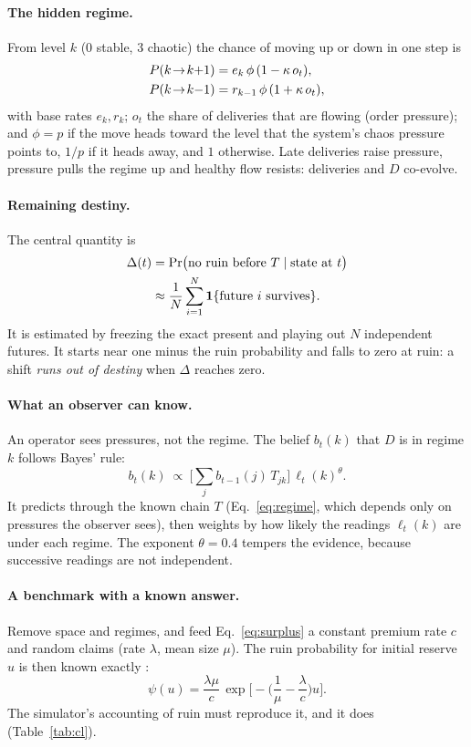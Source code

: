 \documentclass[10pt,twocolumn,a4paper]{article}
\begin{document}
\paragraph{The hidden regime.} From level $k$ (0 stable, 3 chaotic) the chance of moving up or down in one step is
\begin{align}
P(k\!\to\!k{+}1)&=e_k\,\phi\,(1-\kappa\,o_t),\notag\\
P(k\!\to\!k{-}1)&=r_{k-1}\,\phi\,(1+\kappa\,o_t),\label{eq:regime}
\end{align}
with base rates $e_k,r_k$; $o_t$ the share of deliveries that are flowing (order pressure); and $\phi=p$ if the move heads toward the level that the system's chaos pressure points to, $1/p$ if it heads away, and $1$ otherwise. Late deliveries raise pressure, pressure pulls the regime up and healthy flow resists: deliveries and $D$ co-evolve.

\paragraph{Remaining destiny.} The central quantity is
\begin{align}
\Delta(t)&=\Pr\!\big(\text{no ruin before } T\mid\text{state at } t\big)\label{eq:destiny}\\
&\approx\frac1N\sum_{i=1}^{N}\mathbf 1\{\text{future } i\ \text{survives}\}.\notag
\end{align}
It is estimated by freezing the exact present and playing out $N$ independent futures. It starts near one minus the ruin probability and falls to zero at ruin: a shift \emph{runs out of destiny} when $\Delta$ reaches zero.

\paragraph{What an observer can know.} An operator sees pressures, not the regime. The belief $b_t(k)$ that $D$ is in regime $k$ follows Bayes' rule:
\begin{equation}\label{eq:filter}
b_t(k)\ \propto\ \Big[\sum_{j}b_{t-1}(j)\,T_{jk}\Big]\,\ell_t(k)^{\theta}.
\end{equation}
It predicts through the known chain $T$ (Eq.~\ref{eq:regime}, which depends only on pressures the observer sees), then weights by how likely the readings $\ell_t(k)$ are under each regime. The exponent $\theta=0.4$ tempers the evidence, because successive readings are not independent.

\paragraph{A benchmark with a known answer.} Remove space and regimes, and feed Eq.~\eqref{eq:surplus} a constant premium rate $c$ and random claims (rate $\lambda$, mean size $\mu$). The ruin probability for initial reserve $u$ is then known exactly \cite{asmussen2010}:
\begin{equation}\label{eq:cl}
\psi(u)=\frac{\lambda\mu}{c}\,\exp\!\Big[-\Big(\frac1\mu-\frac\lambda c\Big)u\Big].
\end{equation}
The simulator's accounting of ruin must reproduce it, and it does (Table~\ref{tab:cl}).
\end{document}
